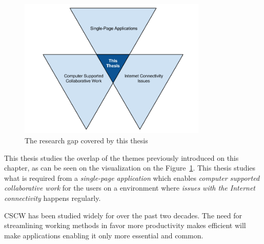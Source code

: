 


\begin{figure}[t]
\begin{center}
\includegraphics[width=0.8\textwidth]{assets/researchgap.png}
\end{center}
\caption{The research gap covered by this thesis}
\label{fig:researchgap}
\end{figure}

This thesis studies the overlap of the themes previously introduced on this chapter, as can be seen on the visualization on the Figure~\ref{fig:researchgap}. This thesis studies what is required from a \textit{single-page application} which enables \textit{computer supported collaborative work} for the users on a environment where \textit{issues with the Internet connectivity} happens regularly. 

CSCW has been studied widely for over the past two decades. The need for streamlining working methods in favor more productivity makes efficient will make applications enabling it only more essential and common.  

